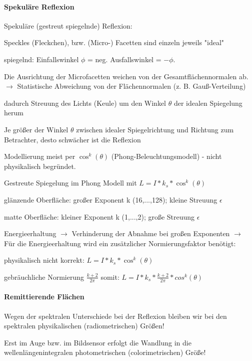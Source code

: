 \documentclass[landscape]{article}
\begin{document}
\begin{multicols}{3}
  \paragraph{Spekuläre Reflexion}
  Spekuläre (gestreut spiegelnde) Reflexion:
  \begin{itemize*}
    \item Speckles (Fleckchen), bzw. (Micro-) Facetten sind einzeln jeweils "ideal"
    \item spiegelnd: Einfallswinkel $\phi$ = neg. Ausfallswinkel = $-\phi$.
    \item Die Ausrichtung der Microfacetten weichen von der Gesamtflächennormalen ab. $\rightarrow$ Statistische Abweichung von der Flächennormalen (z. B. Gauß-Verteilung)
    \item dadurch Streuung des Lichts (Keule) um den Winkel $\theta$ der idealen Spiegelung herum
    \item Je größer der Winkel $\theta$ zwischen idealer Spiegelrichtung und Richtung zum Betrachter, desto schwächer ist die Reflexion
    \item Modellierung meist per $\cos^k(\theta)$ (Phong-Beleuchtungsmodell) - nicht physikalisch begründet.
  \end{itemize*}
  
  
  Gestreute Spiegelung im Phong Modell mit $L=I*k_s*\cos^k(\theta)$
  \begin{itemize*}
    \item glänzende Oberfläche: großer Exponent k (16,...,128); kleine Streuung $\epsilon$
    \item matte Oberfläche: kleiner Exponent k (1,...,2); große Streuung $\epsilon$
  \end{itemize*}
  
  Energieerhaltung $\rightarrow$ Verhinderung der Abnahme bei großen Exponenten $\rightarrow$ Für die Energieerhaltung wird ein zusätzlicher Normierungsfaktor benötigt:
  \begin{itemize*}
    \item physikalisch nicht korrekt:  $L=I*k_s*\cos^k(\theta)$
    \item gebräuchliche Normierung $\frac{k+2}{2\pi}$ somit: $L=I*k_s*\frac{k+2}{2\pi}*cos^k(\theta)$
  \end{itemize*}
  
  \paragraph{Remittierende Flächen}
  \begin{itemize*}
    \item Wegen der spektralen Unterschiede bei der Reflexion bleiben wir bei den spektralen physikalischen (radiometrischen) Größen!
    \item Erst im Auge bzw. im Bildsensor erfolgt die Wandlung in die wellenlängenintegralen photometrischen (colorimetrischen) Größe!
  \end{itemize*}
  

\end{multicols}
\end{document}
